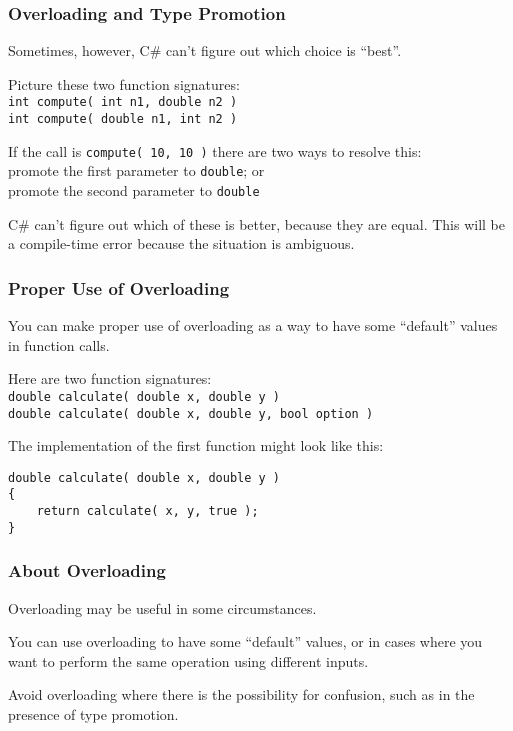 \begin{frame}
\frametitle{Overloading and Type Promotion}
Sometimes, however, C\# can't figure out which choice is ``best''.

Picture these two function signatures:\\
\texttt{int compute( int n1, double n2 )}\\
\texttt{int compute( double n1, int n2 )}

If the call is \texttt{compute( 10, 10 )} there are two ways to resolve this:\\
\quad promote the first parameter to \texttt{double}; or\\
\quad promote the second parameter to \texttt{double}

C\# can't figure out which of these is better, because they are equal. This will be a compile-time error because the situation is ambiguous.

\end{frame}

\begin{frame}[fragile]
\frametitle{Proper Use of Overloading}
You can make proper use of overloading as a way to have some ``default'' values in function calls.

Here are two function signatures:\\
\texttt{double calculate( double x, double y )}\\
\texttt{double calculate( double x, double y, bool option )}

The implementation of the first function might look like this:
\begin{verbatim}
double calculate( double x, double y )
{
    return calculate( x, y, true );
}
\end{verbatim}
\end{frame}


\begin{frame}
\frametitle{About Overloading}

Overloading may be useful in some circumstances.

You can use overloading to have some ``default'' values, or in cases where you want to perform the same operation using different inputs.

Avoid overloading where there is the possibility for confusion, such as in the presence of type promotion.

\end{frame}




